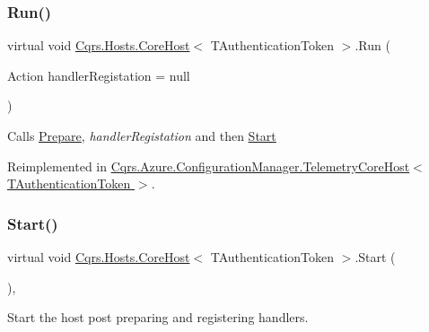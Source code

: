 \subsubsection{\texorpdfstring{Run()}{Run()}}
{\footnotesize\ttfamily virtual void \hyperlink{classCqrs_1_1Hosts_1_1CoreHost}{Cqrs.\+Hosts.\+Core\+Host}$<$ T\+Authentication\+Token $>$.Run (\begin{DoxyParamCaption}\item[{Action}]{handler\+Registation = {\ttfamily null} }\end{DoxyParamCaption})\hspace{0.3cm}{\ttfamily [virtual]}}



Calls \hyperlink{classCqrs_1_1Hosts_1_1CoreHost_aa01932c1199967babe19c3059e86f513_aa01932c1199967babe19c3059e86f513}{Prepare}, {\itshape handler\+Registation}  and then \hyperlink{classCqrs_1_1Hosts_1_1CoreHost_ad8abd7b3c7f6970e106ba42c2745beda_ad8abd7b3c7f6970e106ba42c2745beda}{Start} 



Reimplemented in \hyperlink{classCqrs_1_1Azure_1_1ConfigurationManager_1_1TelemetryCoreHost_a1d7406fe5dd09d6d6e449522a0a2f637_a1d7406fe5dd09d6d6e449522a0a2f637}{Cqrs.\+Azure.\+Configuration\+Manager.\+Telemetry\+Core\+Host$<$ T\+Authentication\+Token $>$}.

\mbox{\label{classCqrs_1_1Hosts_1_1CoreHost_ad8abd7b3c7f6970e106ba42c2745beda_ad8abd7b3c7f6970e106ba42c2745beda}} 
\subsubsection{\texorpdfstring{Start()}{Start()}}
{\footnotesize\ttfamily virtual void \hyperlink{classCqrs_1_1Hosts_1_1CoreHost}{Cqrs.\+Hosts.\+Core\+Host}$<$ T\+Authentication\+Token $>$.Start (\begin{DoxyParamCaption}{ }\end{DoxyParamCaption})\hspace{0.3cm}{\ttfamily [protected]}, {\ttfamily [virtual]}}



Start the host post preparing and registering handlers. 



